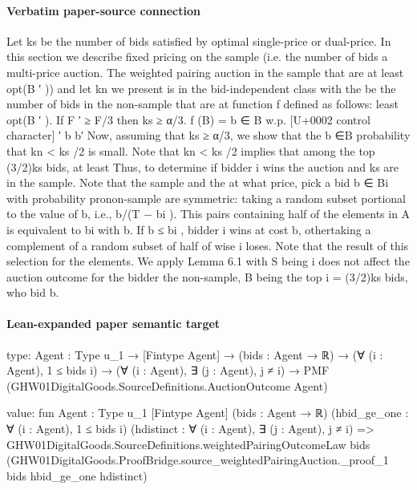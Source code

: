 \documentclass[10pt]{article}
\begin{document}
\paragraph{Verbatim paper-source connection}
\begin{ReviewVerbatim}
Let ks be the number of bids satisfied by optimal single-price or dual-price. In this section we describe
fixed pricing on the sample (i.e. the number of bids a multi-price auction. The weighted pairing auction
in the sample that are at least opt(B ′ )) and let kn we present is in the bid-independent class with the
be the number of bids in the non-sample that are at function f defined as follows:
least opt(B ′ ). If F ′ ≥ F/3 then ks ≥ α/3.
f (B) = b ∈ B w.p. [U+0002 control character] ′ b b′
Now, assuming that ks ≥ α/3, we show that the
b ∈B
probability that kn < ks /2 is small. Note that kn <
ks /2 implies that among the top (3/2)ks bids, at least Thus, to determine if bidder i wins the auction and
ks are in the sample. Note that the sample and the at what price, pick a bid b ∈ Bi with probability pronon-sample are symmetric: taking a random subset portional to the value of b, i.e., b/(T − bi ). This pairs
containing half of the elements in A is equivalent to bi with b. If b ≤ bi , bidder i wins at cost b, othertaking a complement of a random subset of half of wise i loses. Note that the result of this selection for
the elements. We apply Lemma 6.1 with S being i does not affect the auction outcome for the bidder
the non-sample, B being the top i = (3/2)ks bids, who bid b.
\end{ReviewVerbatim}



\paragraph{Lean-expanded paper semantic target}
\begin{ReviewVerbatim}
type:
{Agent : Type u_1} →
  [Fintype Agent] →
    (bids : Agent → ℝ) →
      (∀ (i : Agent), 1 ≤ bids i) →
        (∀ (i : Agent), ∃ (j : Agent), j ≠ i) → PMF (GHW01DigitalGoods.SourceDefinitions.AuctionOutcome Agent)

value:
fun {Agent : Type u_1} [Fintype Agent] (bids : Agent → ℝ) (hbid_ge_one : ∀ (i : Agent), 1 ≤ bids i)
    (hdistinct : ∀ (i : Agent), ∃ (j : Agent), j ≠ i) =>
  GHW01DigitalGoods.SourceDefinitions.weightedPairingOutcomeLaw bids
    (GHW01DigitalGoods.ProofBridge.source_weightedPairingAuction._proof_1 bids hbid_ge_one hdistinct)
\end{ReviewVerbatim}
\end{document}
